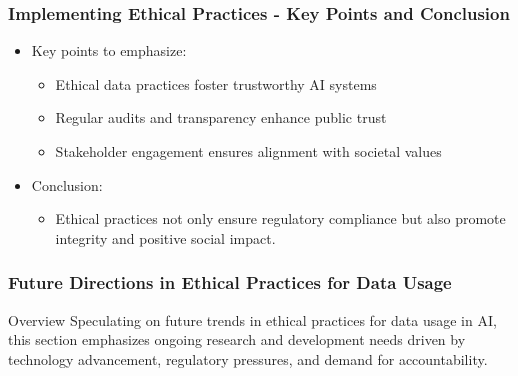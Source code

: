 \documentclass[aspectratio=169]{beamer}
\begin{document}
\begin{frame}[fragile]
    \frametitle{Implementing Ethical Practices - Key Points and Conclusion}
    \begin{itemize}
        \item Key points to emphasize:
        \begin{itemize}
            \item Ethical data practices foster trustworthy AI systems
            \item Regular audits and transparency enhance public trust
            \item Stakeholder engagement ensures alignment with societal values
        \end{itemize}
        \item Conclusion: 
        \begin{itemize}
            \item Ethical practices not only ensure regulatory compliance but also promote integrity and positive social impact.
        \end{itemize}
    \end{itemize}
\end{frame}

\begin{frame}[fragile]
    \frametitle{Future Directions in Ethical Practices for Data Usage}
    \begin{block}{Overview}
        Speculating on future trends in ethical practices for data usage in AI, this section emphasizes ongoing research and development needs driven by technology advancement, regulatory pressures, and demand for accountability.
    \end{block}
\end{frame}
\end{document}

